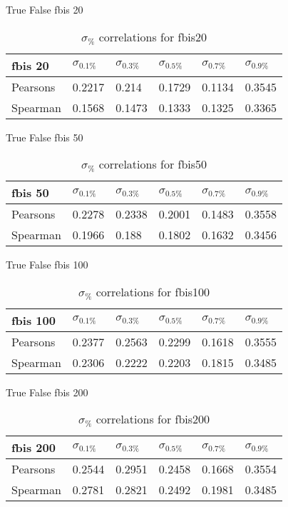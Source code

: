 \documentclass{sig-alternate}
\begin{document}
True False fbis 20
\begin{table}[h!]
\centering
\caption{$\sigma_{\%}$ correlations for fbis20}
\begin{tabular}{|l|l|l|l|l|l|}
\hline
fbis 20 & $\sigma_{0.1\%}$ & $\sigma_{0.3\%}$ & $\sigma_{0.5\%}$ & $\sigma_{0.7\%}$ & $\sigma_{0.9\%}$ \\ \hline
Pearsons  & 0.2217 & 0.214 & 0.1729 & 0.1134 & 0.3545 \\ \hline
Spearman  & 0.1568 & 0.1473 & 0.1333 & 0.1325 & 0.3365 \\ \hline
\end{tabular}
\end{table}
True False fbis 50
\begin{table}[h!]
\centering
\caption{$\sigma_{\%}$ correlations for fbis50}
\begin{tabular}{|l|l|l|l|l|l|}
\hline
fbis 50 & $\sigma_{0.1\%}$ & $\sigma_{0.3\%}$ & $\sigma_{0.5\%}$ & $\sigma_{0.7\%}$ & $\sigma_{0.9\%}$ \\ \hline
Pearsons  & 0.2278 & 0.2338 & 0.2001 & 0.1483 & 0.3558 \\ \hline
Spearman  & 0.1966 & 0.188 & 0.1802 & 0.1632 & 0.3456 \\ \hline
\end{tabular}
\end{table}
True False fbis 100
\begin{table}[h!]
\centering
\caption{$\sigma_{\%}$ correlations for fbis100}
\begin{tabular}{|l|l|l|l|l|l|}
\hline
fbis 100 & $\sigma_{0.1\%}$ & $\sigma_{0.3\%}$ & $\sigma_{0.5\%}$ & $\sigma_{0.7\%}$ & $\sigma_{0.9\%}$ \\ \hline
Pearsons  & 0.2377 & 0.2563 & 0.2299 & 0.1618 & 0.3555 \\ \hline
Spearman  & 0.2306 & 0.2222 & 0.2203 & 0.1815 & 0.3485 \\ \hline
\end{tabular}
\end{table}
True False fbis 200
\begin{table}[h!]
\centering
\caption{$\sigma_{\%}$ correlations for fbis200}
\begin{tabular}{|l|l|l|l|l|l|}
\hline
fbis 200 & $\sigma_{0.1\%}$ & $\sigma_{0.3\%}$ & $\sigma_{0.5\%}$ & $\sigma_{0.7\%}$ & $\sigma_{0.9\%}$ \\ \hline
Pearsons  & 0.2544 & 0.2951 & 0.2458 & 0.1668 & 0.3554 \\ \hline
Spearman  & 0.2781 & 0.2821 & 0.2492 & 0.1981 & 0.3485 \\ \hline
\end{tabular}
\end{table}
\end{document}

